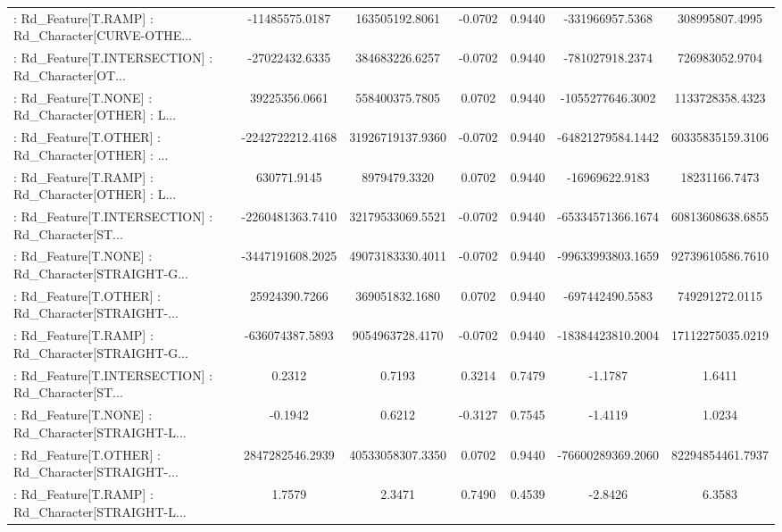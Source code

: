 \begin{longtable}{p{4cm}cccccc}
 : Rd\_Feature[T.RAMP] : Rd\_Character[CURVE-OTHE... &    -11485575.0187 &    163505192.8061 & -0.0702 &       0.9440 &    -331966957.5368 &    308995807.4995 \\
 : Rd\_Feature[T.INTERSECTION] : Rd\_Character[OT... &    -27022432.6335 &    384683226.6257 & -0.0702 &       0.9440 &    -781027918.2374 &    726983052.9704 \\
 : Rd\_Feature[T.NONE] : Rd\_Character[OTHER] : L... &     39225356.0661 &    558400375.7805 &  0.0702 &       0.9440 &   -1055277646.3002 &   1133728358.4323 \\
 : Rd\_Feature[T.OTHER] : Rd\_Character[OTHER] : ... &  -2242722212.4168 &  31926719137.9360 & -0.0702 &       0.9440 &  -64821279584.1442 &  60335835159.3106 \\
 : Rd\_Feature[T.RAMP] : Rd\_Character[OTHER] : L... &       630771.9145 &      8979479.3320 &  0.0702 &       0.9440 &     -16969622.9183 &     18231166.7473 \\
 : Rd\_Feature[T.INTERSECTION] : Rd\_Character[ST... &  -2260481363.7410 &  32179533069.5521 & -0.0702 &       0.9440 &  -65334571366.1674 &  60813608638.6855 \\
 : Rd\_Feature[T.NONE] : Rd\_Character[STRAIGHT-G... &  -3447191608.2025 &  49073183330.4011 & -0.0702 &       0.9440 &  -99633993803.1659 &  92739610586.7610 \\
 : Rd\_Feature[T.OTHER] : Rd\_Character[STRAIGHT-... &     25924390.7266 &    369051832.1680 &  0.0702 &       0.9440 &    -697442490.5583 &    749291272.0115 \\
 : Rd\_Feature[T.RAMP] : Rd\_Character[STRAIGHT-G... &   -636074387.5893 &   9054963728.4170 & -0.0702 &       0.9440 &  -18384423810.2004 &  17112275035.0219 \\
 : Rd\_Feature[T.INTERSECTION] : Rd\_Character[ST... &            0.2312 &            0.7193 &  0.3214 &       0.7479 &            -1.1787 &            1.6411 \\
 : Rd\_Feature[T.NONE] : Rd\_Character[STRAIGHT-L... &           -0.1942 &            0.6212 & -0.3127 &       0.7545 &            -1.4119 &            1.0234 \\
 : Rd\_Feature[T.OTHER] : Rd\_Character[STRAIGHT-... &   2847282546.2939 &  40533058307.3350 &  0.0702 &       0.9440 &  -76600289369.2060 &  82294854461.7937 \\
 : Rd\_Feature[T.RAMP] : Rd\_Character[STRAIGHT-L... &            1.7579 &            2.3471 &  0.7490 &       0.4539 &            -2.8426 &            6.3583 \\

\end{longtable}
